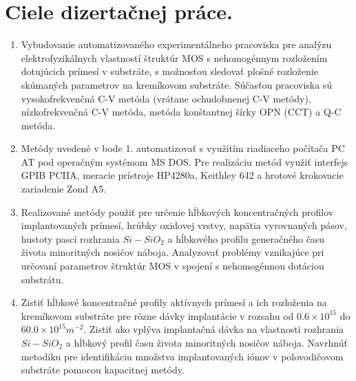 
\chapter{Ciele dizertačnej práce.}%
\label{Chapter2} %

\begin{enumerate}
\item Vybudovanie automatizovaného experimentálneho pracoviska pre
  analýzu elektrofyzikálnych vlastností štruktúr MOS s nehomogénnym
  rozložením dotujúcich prímesí v substráte, s možnosťou sledovať
  plošné rozloženie skúmaných parametrov na kremíkovom substráte.
  Súčasťou pracoviska sú vysokofrekvenčná C-V metóda (vrátane
  ochudobnenej C-V metódy), nízkofrekvenčná C-V metóda, metóda
  konštantnej šírky OPN (CCT) a Q-C metóda.
\item Metódy uvedené v bode 1\@. automatizovať s využitím riadiaceho
  počítača PC AT pod operačným systémom MS DOS\@. Pre realizáciu metód
  využiť interfejs GPIB PCIIA, meracie prístroje HP4280a, Keithley 642
  a hrotové krokovacie zariadenie Zond A5.
\item Realizované metódy použiť pre určenie hĺbkových koncentračných
  profilov implantovaných prímesí, hrúbky oxidovej vrstvy, napätia
  vyrovnaných pásov, hustoty pascí rozhrania $Si-SiO_2$ a hĺbkového
  profilu generačného času života minoritných nosičov náboja.
  Analyzovať problémy vznikajúce pri určovaní parametrov štruktúr MOS
  v spojení s nehomogénnou dotáciou substrátu.
\item Zistiť hĺbkové koncentračné profily aktívnych prímesí a ich
  rozloženia na kremíkovom substráte pre rôzne dávky implantácie v
  rozsahu od $0.6\times{10}^{15}$ do
  $60.0\times{10}^{15}{m}^{-2}$. Zistiť ako vplýva implantačná dávka
  na vlastnosti rozhrania $Si-SiO_2$ a hĺbkový profil času života
  minoritných nosičov náboja.  Navrhnúť metodiku pre identifikáciu
  množstva implantovaných iónov v polovodičovom substráte pomocou
  kapacitnej metódy.
\end{enumerate}
